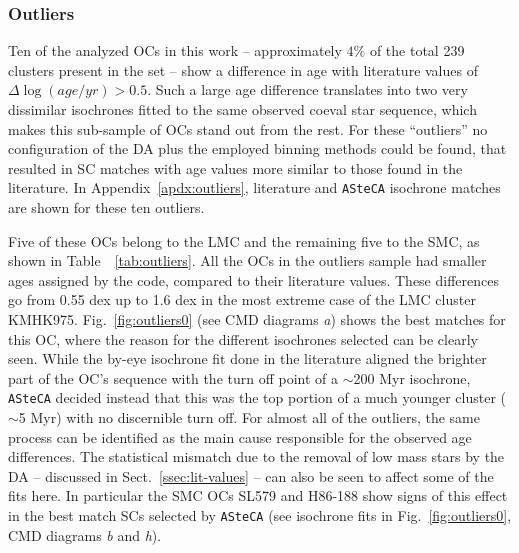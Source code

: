 \documentclass{aa}
\begin{document}

\subsubsection{Outliers}
\label{ssec:outliers}

Ten of the analyzed OCs in this work -- approximately $4\%$ of the total
239 clusters present in the set -- show a difference in age with literature
values of $\Delta\log(age/yr){>}0.5$.
Such a large age difference translates into two very dissimilar isochrones
fitted to the same observed coeval star sequence, which makes this sub-sample of
OCs stand out from the rest.
%
For these ``outliers'' no configuration of the DA plus the employed binning
methods could be found, that resulted in SC matches with age values
more similar to those found in the literature.
In Appendix~\ref{apdx:outliers}, literature and \texttt{ASteCA} isochrone
matches are shown for these ten outliers.

Five of these OCs belong to the LMC and the remaining five to the SMC,
as shown in Table~~\ref{tab:outliers}.
All the OCs in the outliers sample had smaller ages assigned by the code,
compared to their literature values. These differences go from 0.55
dex up to 1.6 dex in the most extreme case of the LMC cluster KMHK975.
%
Fig.~\ref{fig:outliers0} (see CMD diagrams \emph{a}) shows the best matches for
this OC, where the reason for the different isochrones selected can be clearly
seen. While the by-eye isochrone fit done in the literature aligned the brighter
part of the OC's sequence with the turn off point of a $\sim$200 Myr
isochrone, \texttt{ASteCA} decided instead that this was the top portion of a
much younger cluster ($\sim$5 Myr) with no discernible turn off.
%
For almost all of the outliers, the same process can be identified as the main
cause responsible for the observed age differences.
The statistical mismatch due to the removal of low mass stars by the DA
-- discussed in Sect.~\ref{ssec:lit-values} -- can also be seen to affect some
of the fits here. In particular the SMC OCs SL579 and H86-188 show signs of this
effect in the best match SCs selected by \texttt{ASteCA}
(see isochrone fits in Fig.~\ref{fig:outliers0}, CMD diagrams \emph{b} and
\emph{h}).
\end{document}
